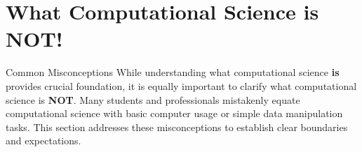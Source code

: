 




\section{What Computational Science is NOT!}

\begin{warningbox}{Common Misconceptions}
While understanding what computational science \textbf{is} provides crucial foundation, it is equally important to clarify what computational science is \textbf{NOT}. Many students and professionals mistakenly equate computational science with basic computer usage or simple data manipulation tasks. This section addresses these misconceptions to establish clear boundaries and expectations.
\end{warningbox}

